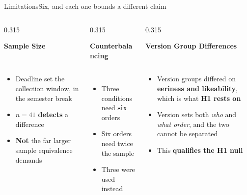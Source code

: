 \documentclass[aspectratio=169,10pt]{beamer}
\newcommand{\hl}[1]{{\color{knblue}\textbf{#1}}}
\newcommand{\good}[1]{{\color{kngreen}\textbf{#1}}}
\newcommand{\bad}[1]{{\color{knred}\textbf{#1}}}
\newcommand{\panelhead}[1]{\noindent\colorbox{kncyan}{\parbox{0.96\textwidth}{\centering\vspace{1pt}\color{white}\scriptsize\bfseries #1\vspace{1pt}}}\\[0.25em]}
\newcommand{\panel}[1]{\noindent\colorbox{knlight}{\parbox{0.96\textwidth}{\vspace{2pt}\scriptsize
\begin{itemize}\setlength{\itemsep}{0.2em}\setlength{\leftmargini}{1.1em}#1\end{itemize}\vspace{2pt}}}}
\begin{document}
\begin{frame}{Limitations}{Six, and each one bounds a different claim}
  \begin{columns}[T]
    \begin{column}{0.315\textwidth}
      \panelhead{Sample Size}
      \panel{%
        \item Deadline set the collection window, in the semester break
        \item $n=41$ \good{detects} a difference
        \item \bad{Not} the far larger sample equivalence demands}
    \end{column}
    \begin{column}{0.315\textwidth}
      \panelhead{Counterbalancing}
      \panel{%
        \item Three conditions need \hl{six} orders
        \item Six orders need twice the sample
        \item Three were used instead}
    \end{column}
    \begin{column}{0.315\textwidth}
      \panelhead{Version Group Differences}
      \panel{%
        \item Version groups differed on \bad{eeriness and likeability}, which is what \hl{H1 rests on}
        \item Version sets both \emph{who} and \emph{what order}, and the two cannot be separated
        \item This \bad{qualifies the H1 null}}
    \end{column}
  \end{columns}
\end{frame}
\end{document}
